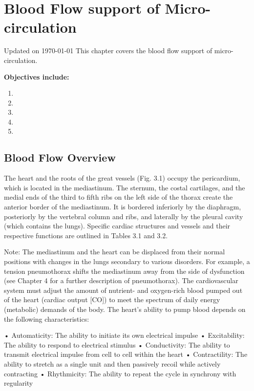 \chapter{Blood Flow support of Micro-circulation}\label{chp:blood_flow}
Updated on \today
\minitoc
This chapter covers the blood flow support of micro-circulation. 

\vspace{5mm}

\textbf{Objectives include:}
\begin{enumerate}
    \item
    \item
    \item
    \item
    \item
\end{enumerate}


\section{Blood Flow Overview}

The heart and the roots of the great vessels (Fig. 3.1) occupy the pericardium, which is located in the mediastinum. The sternum, the costal cartilages, and the medial ends of the third to fifth ribs on the left side of the thorax create the anterior border of the mediastinum. It is bordered inferiorly by the diaphragm, posteriorly by the vertebral column and ribs, and laterally by the pleural cavity (which contains the lungs). Specific cardiac structures and vessels and their respective functions are outlined in Tables 3.1 and 3.2.

Note: The mediastinum and the heart can be displaced from their normal positions with changes in the lungs secondary to various disorders. For example, a tension pneumothorax shifts the mediastinum away from the side of dysfunction (see Chapter 4 for a further description of pneumothorax).
The cardiovascular system must adjust the amount of nutrient- and oxygen-rich blood pumped out of the heart (cardiac output [CO]) to meet the spectrum of daily energy (metabolic) demands of the body.
The heart’s ability to pump blood depends on the following characteristics:


•	Automaticity: The ability to initiate its own electrical impulse
•	Excitability: The ability to respond to electrical stimulus
•	Conductivity: The ability to transmit electrical impulse from cell to cell within the heart
•	Contractility: The ability to stretch as a single unit and then passively recoil while actively contracting
•	Rhythmicity: The ability to repeat the cycle in synchrony with regularity

